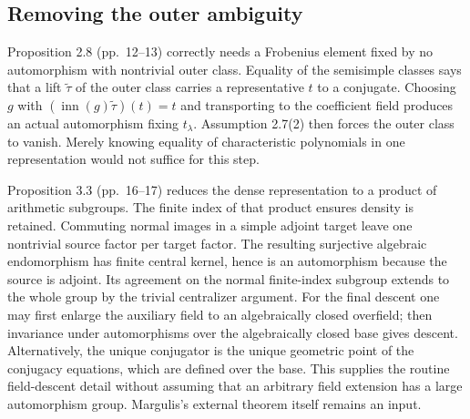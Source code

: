 \documentclass[10pt]{article}
\begin{document}
\subsection*{Removing the outer ambiguity}
Proposition 2.8 (pp. 12–13) correctly needs a Frobenius element fixed by no automorphism with nontrivial outer class. Equality of the semisimple classes says that a lift \(\widetilde\tau\) of the outer class carries a representative \(t\) to a conjugate. Choosing \(g\) with \((\operatorname{inn}(g)\widetilde\tau)(t)=t\) and transporting to the coefficient field produces an actual automorphism fixing \(t_\lambda\). Assumption 2.7(2) then forces the outer class to vanish. Merely knowing equality of characteristic polynomials in one representation would not suffice for this step.\par
Proposition 3.3 (pp. 16–17) reduces the dense representation to a product of arithmetic subgroups. The finite index of that product ensures density is retained. Commuting normal images in a simple adjoint target leave one nontrivial source factor per target factor. The resulting surjective algebraic endomorphism has finite central kernel, hence is an automorphism because the source is adjoint. Its agreement on the normal finite-index subgroup extends to the whole group by the trivial centralizer argument. For the final descent one may first enlarge the auxiliary field to an algebraically closed overfield; then invariance under automorphisms over the algebraically closed base gives descent. Alternatively, the unique conjugator is the unique geometric point of the conjugacy equations, which are defined over the base. This supplies the routine field-descent detail without assuming that an arbitrary field extension has a large automorphism group. Margulis’s external theorem itself remains an input.\par
\end{document}

